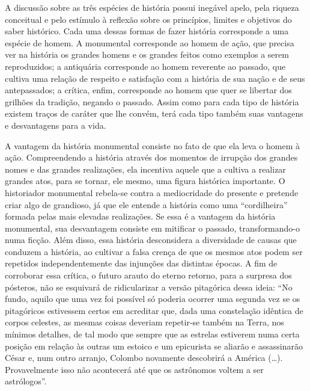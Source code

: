 A discussão sobre as três espécies de história possui inegável apelo,
pela riqueza conceitual e pelo estímulo à reflexão sobre os princípios,
limites e objetivos do saber histórico. Cada uma dessas formas de fazer
história corresponde a uma espécie de homem. A monumental corresponde ao
homem de ação, que precisa ver na história os grandes homens e os
grandes feitos como exemplos a serem reproduzidos; a antiquária
corresponde ao homem reverente ao passado, que cultiva uma relação de
respeito e satisfação com a história de sua nação e de seus
antepassados; a crítica, enfim, corresponde ao homem que quer se
libertar dos grilhões da tradição, negando o passado. Assim como para
cada tipo de história existem traços de caráter que lhe convém, terá cada tipo
também suas vantagens e desvantagens para a vida.

A vantagem da história monumental consiste no fato de que ela leva o
homem à ação. Compreendendo a história através dos momentos de irrupção
dos grandes nomes e das grandes realizações, ela incentiva aquele que a
cultiva a realizar grandes atos, para se tornar, ele mesmo, uma figura
histórica importante. O historiador monumental rebela-se contra a
mediocridade do presente e pretende criar algo de grandioso, já que ele
entende a história como uma ``cordilheira'' formada pelas mais elevadas
realizações. Se essa é a vantagem da história monumental, sua
desvantagem consiste em mitificar o passado, transformando-o numa
ficção. Além disso, essa história desconsidera a diversidade de causas
que conduzem a história, ao cultivar a falsa crença de que os mesmos
atos podem ser repetidos independentemente das injunções das distintas
épocas. A fim de corroborar essa crítica, o futuro arauto do eterno
retorno, para a surpresa dos pósteros, não se esquivará de ridicularizar
a versão pitagórica dessa ideia: ``No fundo, aquilo que uma vez foi
possível só poderia ocorrer uma segunda vez se os pitagóricos estivessem
certos em acreditar que, dada uma constelação idêntica de corpos
celestes, as mesmas coisas deveriam repetir-se também na Terra, nos
mínimos detalhes, de tal modo que sempre que as estrelas estiverem numa
certa posição em relação às outras um estoico e um epicurista se aliarão
e assassinarão César e, num outro arranjo, Colombo novamente descobrirá
a América (\ldots{}). Provavelmente isso não acontecerá até que os astrônomos
voltem a ser astrólogos''.

